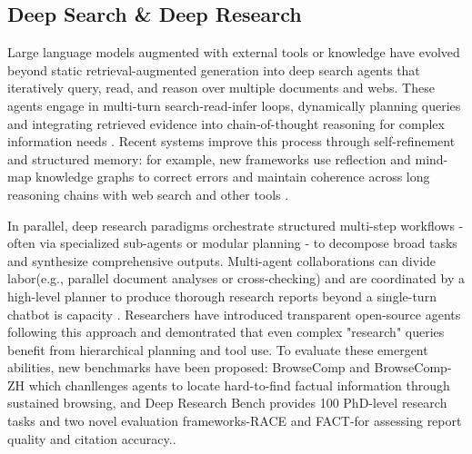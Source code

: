 \documentclass[11pt]{article}
\begin{document}
\subsection{Deep Search \& Deep Research}
Large language models augmented with external tools or knowledge have evolved beyond static retrieval-augmented generation into deep search agents that iteratively query, read, and reason over multiple documents and webs. These agents engage in multi-turn search-read-infer loops, dynamically planning queries and integrating retrieved evidence into chain-of-thought reasoning for complex information needs \cite{xi2025survey, huang2025deep}. Recent systems improve this process through self-refinement and structured memory: for example, new frameworks use reflection and mind-map knowledge graphs to correct errors and maintain coherence across long reasoning chains with web search and other tools \cite{wu2025agentic, guan2025deeprag}.

In parallel, deep research paradigms orchestrate structured multi-step workflows - often via specialized sub-agents or modular planning - to decompose broad tasks and synthesize comprehensive outputs. Multi-agent collaborations can divide labor(e.g., parallel document analyses or cross-checking) and are coordinated by a high-level planner to produce thorough research reports beyond a single-turn chatbot is capacity \cite{zhang2024chain, huang2025manusearch, xu2025comprehensive}. Researchers have introduced transparent open-source agents following this approach \cite{huang2025manusearch} and demontrated that even complex "research" queries benefit from hierarchical planning and tool use. To evaluate these emergent abilities, new benchmarks have been proposed: BrowseComp and BrowseComp-ZH \cite{wei2025browsecomp, zhou2025browsecomp} which chanllenges agents to locate hard-to-find factual information through sustained browsing, and Deep Research Bench provides 100 PhD-level research tasks and two novel evaluation frameworks-RACE and FACT-for assessing report quality and citation accuracy.\cite{mialon2023gaia}.
\end{document}

